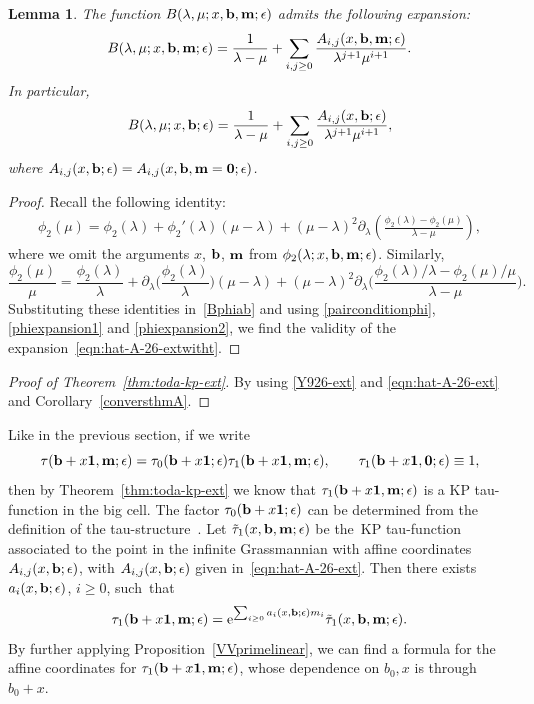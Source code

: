 \documentclass[pdftex]{sigma}
\newcommand{\e}{\epsilon}
\newcommand{\p}{\partial}
\newcommand{\beq}{\begin{equation}}
\newcommand{\eeq}{\end{equation}}
\numberwithin{equation}{section}
\newtheorem{Lemma}[Theorem]{Lemma}
\begin{document}
\begin{Lemma}
The function $B(\lambda,\mu; x, {\bf b},{\bf m};\e)$ admits the following expansion:
\beq\label{eqn:hat-A-26-extwitht}
B(\lambda,\mu; x, {\bf b},{\bf m};\e) =
\frac1{\lambda-\mu} + \sum_{i,j\ge0} \frac{A_{i,j}(x, {\bf b},{\bf m};\e)}{\lambda^{j+1} \mu^{i+1}} .
\eeq
In particular,
\beq\label{eqn:hat-A-26-ext}
B(\lambda,\mu;x, {\bf b};\e) =
\frac1{\lambda-\mu} + \sum_{i,j\ge0} \frac{A_{i,j}(x, {\bf b};\e)}{\lambda^{j+1} \mu^{i+1}} ,
\eeq
where
$A_{i,j}(x, {\bf b};\e)=A_{i,j}(x, {\bf b},{\bf m}={\bf 0};\e)$.
\end{Lemma}
\begin{proof}
Recall the following identity:
\begin{align*}
\phi_2(\mu) = \phi_2(\lambda)+\phi_2'(\lambda)(\mu-\lambda)
+ (\mu-\lambda)^2 \p_\lambda \left(\frac{\phi_2(\lambda)-\phi_2(\mu)}{\lambda-\mu}\right),
\end{align*}
where we omit the arguments $x$, ${\bf b}$, ${\bf m}$ from $\phi_2(\lambda; x, {\bf b}, {\bf m};\e)$.
Similarly,
\[
\frac{\phi_2(\mu)}{\mu} = \frac{\phi_2(\lambda)}{\lambda}+\p_\lambda\biggl(\frac{\phi_2(\lambda)}{\lambda}\biggr) (\mu-\lambda)
+ (\mu-\lambda)^2 \p_\lambda \biggl(\frac{\phi_2(\lambda)/\lambda-\phi_2(\mu)/\mu}{\lambda-\mu}\biggr).
\]
Substituting these identities in~\eqref{Bphiab} and using \eqref{pairconditionphi}, \eqref{phiexpansion1} and \eqref{phiexpansion2}, we find the validity of the expansion~\eqref{eqn:hat-A-26-extwitht}.
\end{proof}


\begin{proof}[Proof of Theorem~\ref{thm:toda-kp-ext}]
By using \eqref{Y926-ext} and \eqref{eqn:hat-A-26-ext} and Corollary~\ref{conversthmA}.
\end{proof}

Like in the previous section, if we write
\[
\tau({\bf b}+x{\bf 1},{\bf m};\e)=\tau_0({\bf b}+x{\bf 1};\e) \tau_1({\bf b}+x{\bf 1}, {\bf m};\e),
\qquad \tau_1({\bf b}+x{\bf 1}, {\bf 0};\e) \equiv 1,
\]
then by Theorem~\ref{thm:toda-kp-ext} we know that $\tau_1({\bf b}+x{\bf 1}, {\bf m};\e)$ is a KP tau-function in the big cell.
The factor $\tau_0({\bf b}+x{\bf 1};\e)$ can be determined from the definition of the tau-structure~\cite{CDZ}.
Let $\tilde{\tau}_1(x, {\bf b}, {\bf m};\e)$ be the~KP tau-function
associated to the point in the infinite Grassmannian with affine coordinates
$A_{i,j}(x, {\bf b};\e)$, with $A_{i,j}(x, {\bf b};\e)$ given in~\eqref{eqn:hat-A-26-ext}. Then there exists
$a_i(x, {\bf b};\e)$, $i\ge0$, such~that
\[
\tau_1({\bf b}+x{\bf 1}, {\bf m};\e) = {\rm e}^{\sum_{i\ge0} a_i(x, {\bf b};\e) m_i} \tilde{\tau}_1(x, {\bf b}, {\bf m};\e).
\]
By further applying Proposition~\ref{VVprimelinear}, we can find a formula for the affine coordinates for
$\tau_1({\bf b}+x{\bf 1}, {\bf m};\e)$, whose
dependence on $b_0, x$ is through $b_0+x$.
\end{document}
